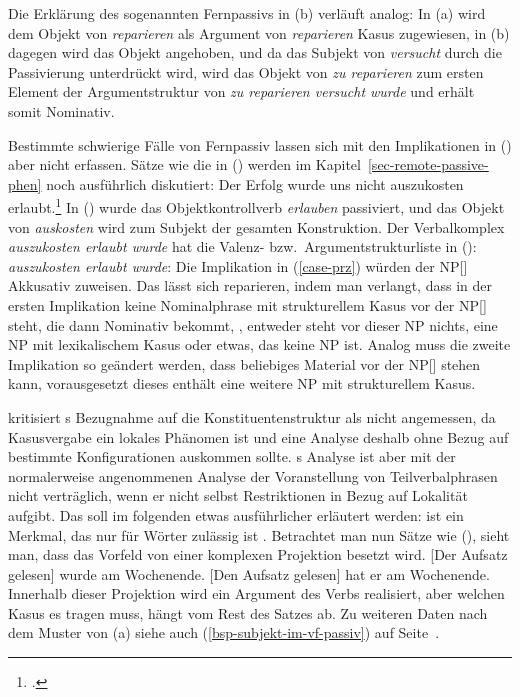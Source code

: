 Die Erklärung des sogenannten Fernpassivs in (b) verläuft analog:
In (a) wird dem Objekt von \emph{reparieren} als Argument von \emph{reparieren} Kasus
zugewiesen, in (b) dagegen wird das Objekt angehoben, und da
das Subjekt von \emph{versucht} durch die Passivierung unterdrückt wird,
wird das Objekt von \emph{zu reparieren} zum ersten Element der
Argumentstruktur von \emph{zu reparieren versucht wurde} und erhält somit
Nominativ.

Bestimmte schwierige Fälle von Fernpassiv lassen sich mit den Implikationen
in () aber nicht erfassen. Sätze wie die
in () werden im Kapitel~\ref{sec-remote-passive-phen}
noch ausführlich diskutiert:
\ea\label{erfolg-auszukosten-erlaubt-kasus}
Der Erfolg        wurde uns      nicht auszukosten erlaubt.\footnote{
        .%
}
\z
In () wurde das Objektkontrollverb \emph{erlauben} passiviert,
und das Objekt von \emph{auskosten} wird zum Subjekt der gesamten Konstruktion.
Der Verbalkomplex \emph{auszukosten erlaubt wurde} hat die Valenz- bzw.\
Argumentstrukturliste in ():
\ea
\emph{auszukosten erlaubt wurde}:   
\z
Die Implikation in (\ref{case-prz}) würden der NP[\str] Akkusativ zuweisen.
Das lässt sich reparieren, indem man verlangt, dass in der ersten Implikation
keine Nominalphrase mit strukturellem Kasus vor der NP[\str] steht, die dann
Nominativ bekommt, \dash, entweder steht vor dieser NP nichts, eine NP mit lexikalischem
Kasus oder etwas, das keine NP ist. Analog muss die zweite Implikation 
so geändert werden, dass beliebiges Material vor der NP[\str] stehen kann,
vorausgesetzt dieses enthält eine weitere NP mit strukturellem Kasus.

\prz kritisiert \citeauthor{HM94a}s Bezugnahme auf die Konstituentenstruktur
als nicht angemessen, da Kasusvergabe ein lokales Phänomen ist und eine
Analyse deshalb ohne Bezug auf bestimmte Konfigurationen auskommen sollte. \prz{}s Analyse ist aber
mit der normalerweise angenommenen Analyse der Voranstellung von Teilverbalphrasen nicht verträglich, wenn er nicht
selbst Restriktionen in Bezug auf Lokalität\is{Lokalität} aufgibt. Das soll im folgenden
etwas ausführlicher erläutert werden: \argst ist ein Merkmal, das nur für
Wörter zulässig ist \citep[\page 236]{Prze99}. Betrachtet man nun Sätze wie
(\mex{1}), sieht man, dass das Vorfeld von einer komplexen Projektion
besetzt wird.
\eal
\label{bsp-der-aufsatz-gelesen}
\ex {}[Der Aufsatz gelesen] wurde am Wochenende.
\ex {}[Den Aufsatz gelesen] hat er am Wochenende.
\zl
Innerhalb dieser Projektion wird ein Argument des Verbs realisiert,
aber welchen Kasus es tragen muss, hängt vom Rest des Satzes ab.
Zu weiteren Daten nach dem Muster von (\mex{0}a)
siehe auch (\ref{bsp-subjekt-im-vf-passiv}) auf Seite~\pageref{bsp-subjekt-im-vf-passiv}.


